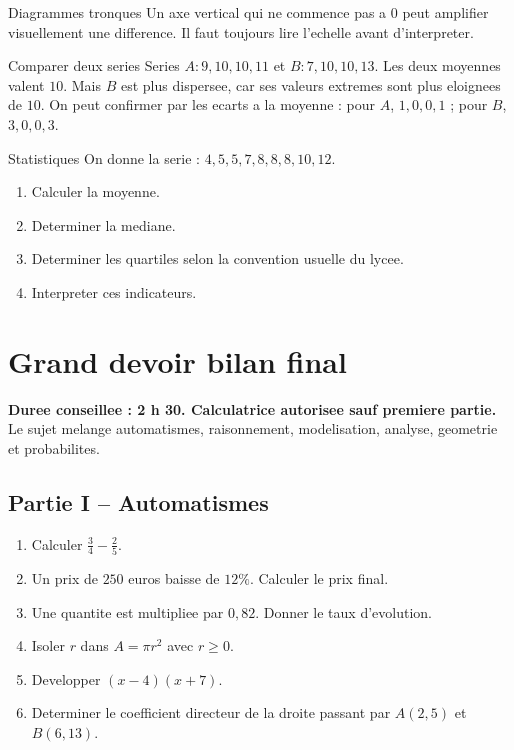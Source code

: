 \documentclass[11pt,a4paper]{article}
\begin{document}
\begin{boiteattention}{Diagrammes tronques}
Un axe vertical qui ne commence pas a $0$ peut amplifier visuellement une difference. Il faut toujours lire l'echelle avant d'interpreter.
\end{boiteattention}

\begin{boiteexemple}{Comparer deux series}
Series $A: 9,10,10,11$ et $B: 7,10,10,13$. Les deux moyennes valent $10$. Mais $B$ est plus dispersee, car ses valeurs extremes sont plus eloignees de $10$. On peut confirmer par les ecarts a la moyenne : pour $A$, $1,0,0,1$ ; pour $B$, $3,0,0,3$.
\end{boiteexemple}

\begin{exobox}{Statistiques}
On donne la serie : $4,5,5,7,8,8,8,10,12$.
\begin{enumerate}
  \item Calculer la moyenne.
  \item Determiner la mediane.
  \item Determiner les quartiles selon la convention usuelle du lycee.
  \item Interpreter ces indicateurs.
\end{enumerate}
\end{exobox}

\section{Grand devoir bilan final}

\begin{center}
\begin{tcolorbox}[width=0.9\linewidth,colback=softyellow,colframe=orange!80!black]
\textbf{Duree conseillee : 2 h 30. Calculatrice autorisee sauf premiere partie.} Le sujet melange automatismes, raisonnement, modelisation, analyse, geometrie et probabilites.
\end{tcolorbox}
\end{center}

\subsection*{Partie I -- Automatismes}
\begin{enumerate}
  \item Calculer $\frac34-\frac25$.
  \item Un prix de $250$ euros baisse de $12\%$. Calculer le prix final.
  \item Une quantite est multipliee par $0,82$. Donner le taux d'evolution.
  \item Isoler $r$ dans $A=\pi r^2$ avec $r\ge0$.
  \item Developper $(x-4)(x+7)$.
  \item Determiner le coefficient directeur de la droite passant par $A(2,5)$ et $B(6,13)$.
\end{enumerate}
\end{document}
